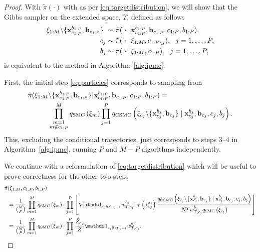 \begin{proof}
	With $\tilde\pi(\cdot)$ with as per \eqref{eq:targetdistribution}, we will show that the Gibbs sampler on the extended space, $\Upsilon$, defined as follows	
	\begin{subequations}
		\label{eq:gibbs}
		\begin{align}
		\mathbf{\xi}_{1:M} \backslash\{\mathbf{x}_{c_{1:P}}^{b_{1:P}}, \mathbf{b}_{c_{1:P}} \} ~&\sim \tilde \pi(~\cdot~|\mathbf{x}_{c_{1:P}}^{b_{1:P}}, \mathbf{b}_{c_{1:P}},c_{1:P}, b_{1:P})\label{eq:particles},\\
		c_j &\sim \tilde \pi(~\cdot~|\mathbf{\xi}_{1:M}, c_{1:P\backslash j}), ~~j=1,\ldots,P,\label{eq:worker}\\
		b_j &\sim \tilde \pi(~\cdot~|\mathbf{\xi}_{1:M}, c_{1:P}), ~~j=1,\ldots,P,\label{eq:index}
		\end{align}
	\end{subequations}
	is equivalent to the \ipmcmc method in Algorithm~\ref{alg:ipmc}.
	
	First, the initial step \eqref{eq:particles} corresponds to sampling from
	\begin{align*}
	\tilde\pi(\mathbf{\xi}_{1:M} &\backslash\{\mathbf{x}_{c_{1:P}}^{b_{1:P}}, \mathbf{b}_{c_{1:P}} \} | \mathbf{x}_{c_{1:P}}^{b_{1:P}}, \mathbf{b}_{c_{1:P}},c_{1:P}, b_{1:P}) = \\ 
	& \prod_{\substack{m=1\\m\notin c_{1:P}}}^M q_{\text{SMC}}\left(\mathbf{\xi}_m\right) \prod_{j = 1}^P q_{\text{CSMC}}\left(\mathbf{\xi}_{c_j} \backslash \{\mathbf{x}_{c_j}^{b_j}, \mathbf{b}_{c_j}\} \mid \mathbf{x}_{c_j}^{b_j}, \mathbf{b}_{c_j}, c_j, b_j \right).
	\end{align*}
	This, excluding the conditional trajectories, just corresponds to steps 3--4 in Algorithm~\ref{alg:ipmc}, \ie running $P$ \csmc and $M-P$ \smc algorithms independently.
	
	We continue with a reformulation of \eqref{eq:targetdistribution} which will be useful to prove correctness for the other two steps
	\begin{align}
	\label{eq:reformtargetdist}
	\tilde \pi & (\xib_{1:M},  c_{1:P}, b_{1:P}) \nonumber\\ &=\frac{1}{\binom{M}{P}} \prod_{m=1}^M q_{\text{SMC}}\left(\xib_m\right) \cdot
	\prod_{j = 1}^P \left[
	\iden_{c_j \notin c_{1:j-1}} \nw_{T,c_j}^{b_j}
	\pi_T\left(\xb_{c_j}^{b_j}\right) \frac{q_{\text{CSMC}}\left(\xib_{c_j} \backslash \{\xb_{c_j}^{b_j}, \bb_{c_j}\} \mid \xb_{c_j}^{b_j}, \bb_{c_j}, c_j, b_j \right)}{N^{T} 
		\nw_{T,c_j}^{b_j}
		q_{\text{SMC}}\left(\xib_{c_j}\right)}\right] \nonumber\\
	&= \frac{1}{\binom{M}{P}} \prod_{m=1}^M q_{\text{SMC}}\left(\xib_m\right) \cdot \prod_{j = 1}^P \frac{\hat Z_{c_j}}{Z}\iden_{c_j \notin c_{1:j-1}} 
	\nw_{T,c_j}^{b_j}
	.
	\end{align}
	

\end{proof}
